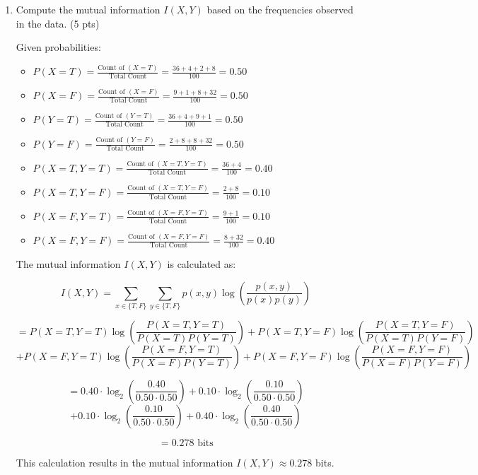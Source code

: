 \documentclass[a4paper]{article}
\theoremstyle{definition}
\newenvironment{soln}{
	\leavevmode\color{blue}\ignorespaces
}{}
\begin{document}
\begin{enumerate}
	\item Compute the mutual information $I(X, Y)$ based on the frequencies observed in the data. (5 pts)
	\begin{soln}
		Given probabilities:
		\begin{itemize}
			\item $P(X=T) = \frac{\text{Count of }(X=T)}{\text{Total Count}} = \frac{36 + 4 + 2 + 8}{100} = 0.50$
			\item $P(X=F) = \frac{\text{Count of }(X=F)}{\text{Total Count}} = \frac{9 + 1 + 8 + 32}{100} = 0.50$
			\item $P(Y=T) = \frac{\text{Count of }(Y=T)}{\text{Total Count}} = \frac{36 + 4 + 9 + 1}{100} = 0.50$
			\item $P(Y=F) = \frac{\text{Count of }(Y=F)}{\text{Total Count}} = \frac{2 + 8 + 8 + 32}{100} = 0.50$
			\item $P(X=T, Y=T) = \frac{\text{Count of }(X=T, Y=T)}{\text{Total Count}} = \frac{36 + 4}{100} = 0.40$
			\item $P(X=T, Y=F) = \frac{\text{Count of }(X=T, Y=F)}{\text{Total Count}} = \frac{2 + 8}{100} = 0.10$
			\item $P(X=F, Y=T) = \frac{\text{Count of }(X=F, Y=T)}{\text{Total Count}} = \frac{9 + 1}{100} = 0.10$
			\item $P(X=F, Y=F) = \frac{\text{Count of }(X=F, Y=F)}{\text{Total Count}} = \frac{8 + 32}{100} = 0.40$
		\end{itemize}

		The mutual information $I(X, Y)$ is calculated as:

		\[
		I(X, Y) = \sum_{x \in \{T, F\}} \sum_{y \in \{T, F\}} p(x, y) \log\left(\frac{p(x, y)}{p(x)p(y)}\right)
		\]

		\[
		= P(X=T, Y=T) \log\left(\frac{P(X=T, Y=T)}{P(X=T)P(Y=T)}\right) + P(X=T, Y=F) \log\left(\frac{P(X=T, Y=F)}{P(X=T)P(Y=F)}\right)
		\]
		\[
		+ P(X=F, Y=T) \log\left(\frac{P(X=F, Y=T)}{P(X=F)P(Y=T)}\right) + P(X=F, Y=F) \log\left(\frac{P(X=F, Y=F)}{P(X=F)P(Y=F)}\right)
		\]

		\[
		= 0.40 \cdot \log_2\left(\frac{0.40}{0.50 \cdot 0.50}\right) + 0.10 \cdot \log_2\left(\frac{0.10}{0.50 \cdot 0.50}\right)
		\]
		\[
		+ 0.10 \cdot \log_2\left(\frac{0.10}{0.50 \cdot 0.50}\right) + 0.40 \cdot \log_2\left(\frac{0.40}{0.50 \cdot 0.50}\right)
		\]

		\[
		= 0.278 \text{ bits}
		\]

		This calculation results in the mutual information $I(X, Y) \approx 0.278$ bits.


\end{soln}
\end{enumerate}
\end{document}
